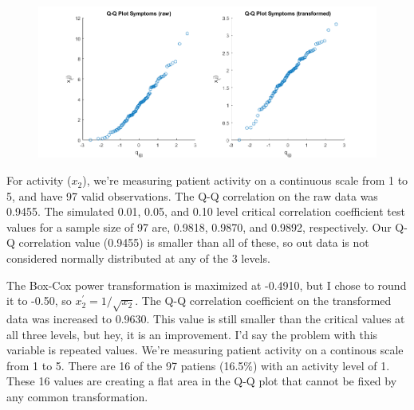 \begin{center}
    \begin{figure}[H]
        \centering
        \includegraphics[scale=0.4]{./matlab/chapter-4/sol4.32.qq.1.png}
    \end{figure}
\end{center}

For activity ($x_{2}$), we're measuring patient activity on a continuous scale from 1 to 5, and have 97 valid observations. The Q-Q correlation on the raw data was 0.9455. The simulated 0.01, 0.05, and 0.10 level critical correlation coefficient test values for a sample size of 97 are, 0.9818, 0.9870, and 0.9892, respectively. Our Q-Q correlation value (0.9455) is smaller than all of these, so out data is not considered normally distributed at any of the 3 levels.

The Box-Cox power transformation is maximized at -0.4910, but I chose to round it to -0.50, so $x_{2}^{\prime} = 1/\sqrt{x_{2}}$. The Q-Q correlation coefficient on the transformed data was increased to 0.9630. This value is still smaller than the critical values at all three levels, but hey, it is an improvement. I'd say the problem with this variable is repeated values. We're measuring patient activity on a continous scale from 1 to 5. There are 16 of the 97 patiens (16.5\%) with an activity level of 1. These 16 values are creating a flat area in the Q-Q plot that cannot be fixed by any common transformation.


